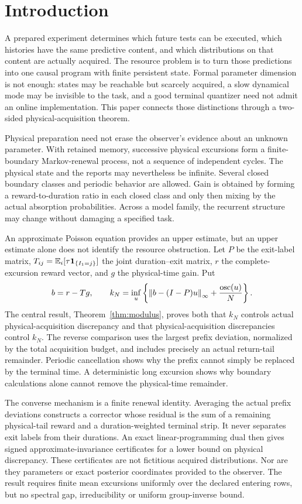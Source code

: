 \section{Introduction}
A prepared experiment determines which future tests can be executed, which histories have the same predictive content, and which distributions on that content are actually acquired. The resource problem is to turn those predictions into one causal program with finite persistent state. Formal parameter dimension is not enough: states may be reachable but scarcely acquired, a slow dynamical mode may be invisible to the task, and a good terminal quantizer need not admit an online implementation. This paper connects those distinctions through a two-sided physical-acquisition theorem.

Physical preparation need not erase the observer's evidence about an unknown parameter. With retained memory, successive physical excursions form a finite-boundary Markov-renewal process, not a sequence of independent cycles. The physical state and the reports may nevertheless be infinite. Several closed boundary classes and periodic behavior are allowed. Gain is obtained by forming a reward-to-duration ratio in each closed class and only then mixing by the actual absorption probabilities. Across a model family, the recurrent structure may change without damaging a specified task.

An approximate Poisson equation provides an upper estimate, but an upper estimate alone does not identify the resource obstruction. Let $P$ be the exit-label matrix, $T_{ij}=\mathbb E_i[\tau\mathbf 1_{\{I_1=j\}}]$ the joint duration--exit matrix, $r$ the complete-excursion reward vector, and $g$ the physical-time gain. Put
\begin{equation}\label{eq:intro-poisson}
 b=r-Tg,\qquad
 k_N=\inf_u\left\{\left\lVert b-(I-P)u\right\rVert_\infty+\frac{\operatorname{osc}(u)}N\right\}.
\end{equation}
The central result, Theorem~\ref{thm:modulus}, proves both that $k_N$ controls actual physical-acquisition discrepancy and that physical-acquisition discrepancies control $k_N$. The reverse comparison uses the largest prefix deviation, normalized by the total acquisition budget, and includes precisely an actual return-tail remainder. Periodic cancellation shows why the prefix cannot simply be replaced by the terminal time. A deterministic long excursion shows why boundary calculations alone cannot remove the physical-time remainder.

The converse mechanism is a finite renewal identity. Averaging the actual prefix deviations constructs a corrector whose residual is the sum of a remaining physical-tail reward and a duration-weighted terminal strip. It never separates exit labels from their durations. An exact linear-programming dual then gives signed approximate-invariance certificates for a lower bound on physical discrepancy. These certificates are not fictitious acquired distributions. Nor are they parameters or exact posterior coordinates provided to the observer. The result requires finite mean excursions uniformly over the declared entering rows, but no spectral gap, irreducibility or uniform group-inverse bound.

